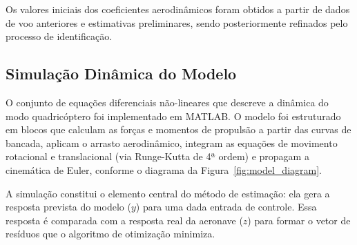 \documentclass[letterpaper, 10 pt, conference]{ieeeconf}
\begin{document}
Os valores iniciais dos coeficientes aerodinâmicos foram obtidos a partir de dados de voo anteriores e estimativas preliminares, sendo posteriormente refinados pelo processo de identificação.

\subsection{Simulação Dinâmica do Modelo}

O conjunto de equações diferenciais não-lineares que descreve a dinâmica do modo quadricóptero foi implementado em MATLAB. O modelo foi estruturado em blocos que calculam as forças e momentos de propulsão a partir das curvas de bancada, aplicam o arrasto aerodinâmico, integram as equações de movimento rotacional e translacional (via Runge-Kutta de 4ª ordem) e propagam a cinemática de Euler, conforme o diagrama da Figura~\ref{fig:model_diagram}.

A simulação constitui o elemento central do método de estimação: ela gera a resposta prevista do modelo ($y$) para uma dada entrada de controle. Essa resposta é comparada com a resposta real da aeronave ($z$) para formar o vetor de resíduos que o algoritmo de otimização minimiza.
\end{document}
